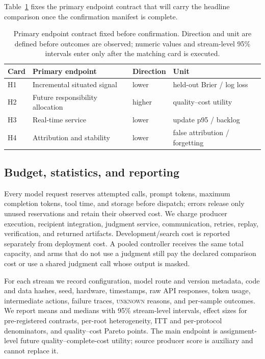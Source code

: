 \documentclass[sigconf,anonymous]{aamas}
\newcommand{\unknown}{\textsc{unknown}}
\begin{document}
Table~\ref{tab:headline} fixes the primary endpoint contract that will carry the headline comparison once the confirmation manifest is complete.
\begin{table}[t]
\centering\small
\setlength{\tabcolsep}{2.5pt}
\caption{Primary endpoint contract fixed before confirmation. Direction and unit are defined before outcomes are observed; numeric values and stream-level 95\% intervals enter only after the matching card is executed.}
\label{tab:headline}
\begin{tabular}{p{}p{}p{}p{}}
\toprule
Card & Primary endpoint & Direction & Unit\\
\midrule
H1 & Incremental situated signal & lower & held-out Brier / log loss\\
H2 & Future responsibility allocation & higher & quality--cost utility\\
H3 & Real-time service & lower & update p95 / backlog\\
H4 & Attribution and stability & lower & false attribution / forgetting\\
\bottomrule
\end{tabular}
\end{table}

\subsection{Budget, statistics, and reporting}
Every model request reserves attempted calls, prompt tokens, maximum completion tokens, tool time, and storage before dispatch; errors release only unused reservations and retain their observed cost. We charge producer execution, recipient integration, judgment service, communication, retries, replay, verification, and returned artifacts. Development/search cost is reported separately from deployment cost. A pooled controller receives the same total capacity, and arms that do not use a judgment still pay the declared comparison cost or use a shared judgment call whose output is masked.

For each stream we record configuration, model route and version metadata, code and data hashes, seed, hardware, timestamps, raw API responses, token usage, intermediate actions, failure traces, \unknown{} reasons, and per-sample outcomes. We report means and medians with 95\% stream-level intervals, effect sizes for pre-registered contrasts, per-root heterogeneity, ITT and per-protocol denominators, and quality--cost Pareto points. The main endpoint is assignment-level future quality--complete-cost utility; source producer score is auxiliary and cannot replace it.
\end{document}
